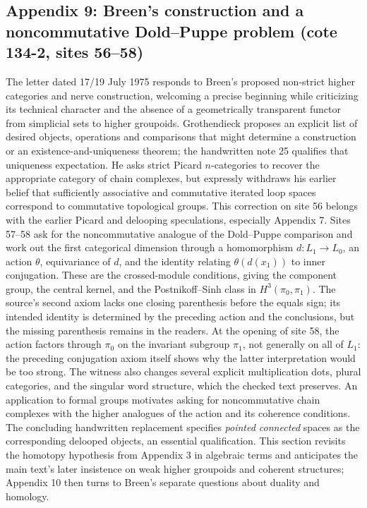 \documentclass[10pt,oneside]{book}
\begin{document}
\subsection*{Appendix 9: Breen's construction and a noncommutative Dold--Puppe problem (cote 134-2, sites 56--58)}
The letter dated 17/19 July 1975 responds to Breen's proposed non-strict higher categories and nerve construction, welcoming a precise beginning while criticizing its technical character and the absence of a geometrically transparent functor from simplicial sets to higher groupoids. Grothendieck proposes an explicit list of desired objects, operations and comparisons that might determine a construction or an existence-and-uniqueness theorem; the handwritten note 25 qualifies that uniqueness expectation. He asks strict Picard $n$-categories to recover the appropriate category of chain complexes, but expressly withdraws his earlier belief that sufficiently associative and commutative iterated loop spaces correspond to commutative topological groups. This correction on site 56 belongs with the earlier Picard and delooping speculations, especially Appendix 7. Sites 57--58 ask for the noncommutative analogue of the Dold--Puppe comparison and work out the first categorical dimension through a homomorphism $d:L_1\to L_0$, an action $\theta$, equivariance of $d$, and the identity relating $\theta(d(x_1))$ to inner conjugation. These are the crossed-module conditions, giving the component group, the central kernel, and the Postnikoff--Sinh class in $H^3(\pi_0,\pi_1)$. The source's second axiom lacks one closing parenthesis before the equals sign; its intended identity is determined by the preceding action and the conclusions, but the missing parenthesis remains in the readers. At the opening of site 58, the action factors through $\pi_0$ on the invariant subgroup $\pi_1$, not generally on all of $L_1$: the preceding conjugation axiom itself shows why the latter interpretation would be too strong. The witness also changes several explicit multiplication dots, plural categories, and the singular word structure, which the checked text preserves. An application to formal groups motivates asking for noncommutative chain complexes with the higher analogues of the action and its coherence conditions. The concluding handwritten replacement specifies \emph{pointed connected} spaces as the corresponding delooped objects, an essential qualification. This section revisits the homotopy hypothesis from Appendix 3 in algebraic terms and anticipates the main text's later insistence on weak higher groupoids and coherent structures; Appendix 10 then turns to Breen's separate questions about duality and homology.
\end{document}
